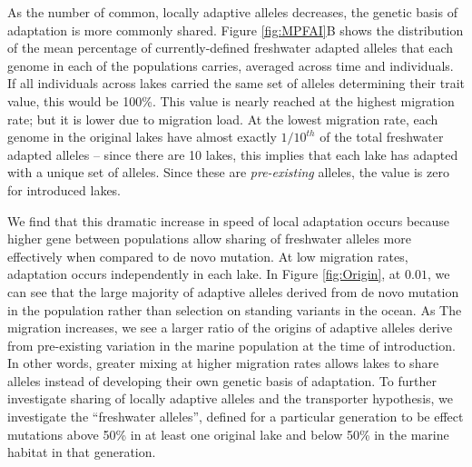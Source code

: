 \documentclass{article}
\begin{document}
As the number of common, locally adaptive alleles decreases, the genetic basis of adaptation is more commonly shared. Figure \ref{fig:MPFAI}B shows the distribution of the mean percentage of currently-defined freshwater adapted alleles that each genome in each of the populations carries, averaged across time and individuals. If all individuals across lakes carried the same set of alleles determining their trait value, this would be 100\%. This value is nearly reached at the highest migration rate; but it is lower due to migration load. At the lowest migration rate, each genome in the original lakes have almost exactly $1/10^{th}$ of the total freshwater adapted alleles -- since there are 10 lakes, this implies that each lake has adapted with a unique set of alleles. Since these are \emph{pre-existing} alleles, the value is zero for introduced lakes.

We find that this dramatic increase in speed of local adaptation occurs because
higher gene between populations allow sharing of freshwater alleles more effectively when compared to de novo mutation.
At low migration rates, adaptation occurs independently in each lake.
In Figure \ref{fig:Origin}, at $0.01$, we can see that the large majority of adaptive alleles derived from de novo mutation in the 
population rather than selection on standing variants in the ocean. 
As The migration increases, we see a larger ratio of the origins of adaptive alleles 
derive from pre-existing variation in the marine population at the time of introduction.
In other words, 
greater mixing at higher migration rates allows lakes to share alleles
instead of developing their own genetic basis of adaptation.
To further investigate sharing of locally adaptive alleles and the transporter hypothesis,
we investigate the ``freshwater alleles'', defined for a particular generation
to be effect mutations above 50\% in at least one original lake and below 50\% in the marine habitat in that generation.
\end{document}
